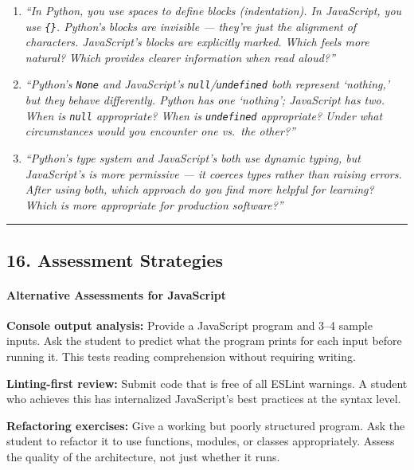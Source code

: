 \documentclass[
  justified,
  openright,
]{tufte-book}
\let\subsubsection\paragraph
\let\paragraph\paragraph
\let\subsubsection\paragraph
\let\paragraph\paragraph
\begin{document}
\begin{enumerate}
\def\labelenumi{\arabic{enumi}.}
\item
  \emph{``In Python, you use spaces to define blocks (indentation). In
  JavaScript, you use \texttt{\{\}}. Python's blocks are invisible ---
  they're just the alignment of characters. JavaScript's blocks are
  explicitly marked. Which feels more natural? Which provides clearer
  information when read aloud?''}
\item
  \emph{``Python's \texttt{None} and JavaScript's
  \texttt{null}/\texttt{undefined} both represent `nothing,' but they
  behave differently. Python has one `nothing'; JavaScript has two. When
  is \texttt{null} appropriate? When is \texttt{undefined} appropriate?
  Under what circumstances would you encounter one vs.~the other?''}
\item
  \emph{``Python's type system and JavaScript's both use dynamic typing,
  but JavaScript's is more permissive --- it coerces types rather than
  raising errors. After using both, which approach do you find more
  helpful for learning? Which is more appropriate for production
  software?''}
\end{enumerate}

\begin{center}\rule{0.5\linewidth}{0.5pt}\end{center}

\subsection{16. Assessment Strategies}\label{assessment-strategies}

\subsubsection{Alternative Assessments for
JavaScript}\label{alternative-assessments-for-javascript}

\textbf{Console output analysis:} Provide a JavaScript program and 3--4
sample inputs. Ask the student to predict what the program prints for
each input before running it. This tests reading comprehension without
requiring writing.

\textbf{Linting-first review:} Submit code that is free of all ESLint
warnings. A student who achieves this has internalized JavaScript's best
practices at the syntax level.

\textbf{Refactoring exercises:} Give a working but poorly structured
program. Ask the student to refactor it to use functions, modules, or
classes appropriately. Assess the quality of the architecture, not just
whether it runs.
\end{document}

